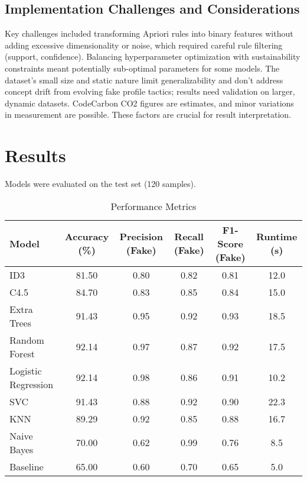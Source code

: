 \documentclass[conference]{IEEEtran}
\begin{document}
\subsection{Implementation Challenges and Considerations}
Key challenges included transforming Apriori rules into binary features without adding excessive dimensionality or noise, which required careful rule filtering (support, confidence). Balancing hyperparameter optimization with sustainability constraints meant potentially sub-optimal parameters for some models. The dataset's small size and static nature \cite{b5} limit generalizability and don't address concept drift from evolving fake profile tactics; results need validation on larger, dynamic datasets. CodeCarbon CO2 figures are estimates, and minor variations in measurement are possible. These factors are crucial for result interpretation.

\section{Results}
\label{sec:results}
Models were evaluated on the test set (120 samples).

\begin{table*}[htbp]
\caption{Performance Metrics}
\begin{center}
\begin{tabular}{|l|c|c|c|c|c|}
\hline
\textbf{Model} & \textbf{Accuracy (\%)} & \textbf{Precision (Fake)} & \textbf{Recall (Fake)} & \textbf{F1-Score (Fake)} & \textbf{Runtime (s)} \\
\hline
ID3 & 81.50 & 0.80 & 0.82 & 0.81 & 12.0 \\
C4.5 & 84.70 & 0.83 & 0.85 & 0.84 & 15.0 \\
Extra Trees & 91.43 & 0.95 & 0.92 & 0.93 & 18.5 \\
Random Forest & 92.14 & 0.97 & 0.87 & 0.92 & 17.5 \\
Logistic Regression & 92.14 & 0.98 & 0.86 & 0.91 & 10.2 \\
SVC & 91.43 & 0.88 & 0.92 & 0.90 & 22.3 \\
KNN & 89.29 & 0.92 & 0.85 & 0.88 & 16.7 \\
Naive Bayes & 70.00 & 0.62 & 0.99 & 0.76 & 8.5 \\
Baseline & 65.00 & 0.60 & 0.70 & 0.65 & 5.0 \\
\hline
\end{tabular}
\label{tab:perf}
\end{center}
\end{table*}
\end{document}
